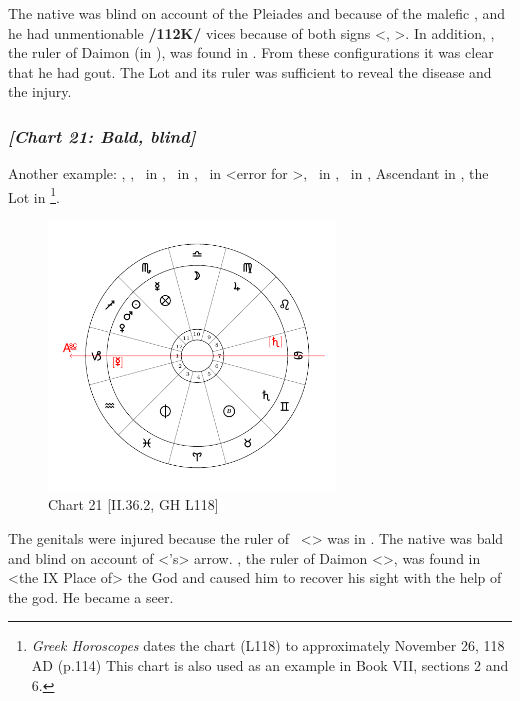 The native was blind on account of the Pleiades and because of the malefic \Saturn, and he had unmentionable \textbf{/112K/} vices because of both signs <\Capricorn, \Taurus>. In addition, \Jupiter, the ruler of Daimon (in \Pisces), was found in \Capricorn. From these configurations it was clear that he had gout. The Lot and its ruler was sufficient to reveal the disease and the injury.
\newpage

\subsubsection{\textit{[Chart 21: Bald, blind]}}
Another example: \Sun, \Venus, \Mars\, in \Sagittarius, \Moon\, in \Libra, \Saturn\, in \Cancer <error for
\Gemini>, \Jupiter\, in \Virgo, \Mercury\, in \Scorpio, Ascendant in \Capricorn, the Lot in \Scorpio
\footnote{\textit{Greek Horoscopes} dates the chart (L118) to approximately November 26, 118 AD (p.114) This chart is also used as an example in Book VII, sections 2 and 6.}.

\clearpage
\begin{figure}
\centering
\vspace{-20pt}
\includegraphics[width=0.68\textwidth]{charts/2_36_2}
\caption{Chart 21 [II.36.2, GH L118]}
\label{fig:chart21}
\end{figure}

The genitals were injured because the ruler of \Scorpio\, <\Mars> was in \Sagittarius. The native was bald and blind on account of <\Sagittarius’s> arrow. \Jupiter, the ruler of Daimon <\Pisces>, was found in <the IX Place of>
the God and caused him to recover his sight with the help of the god. He became a seer.

